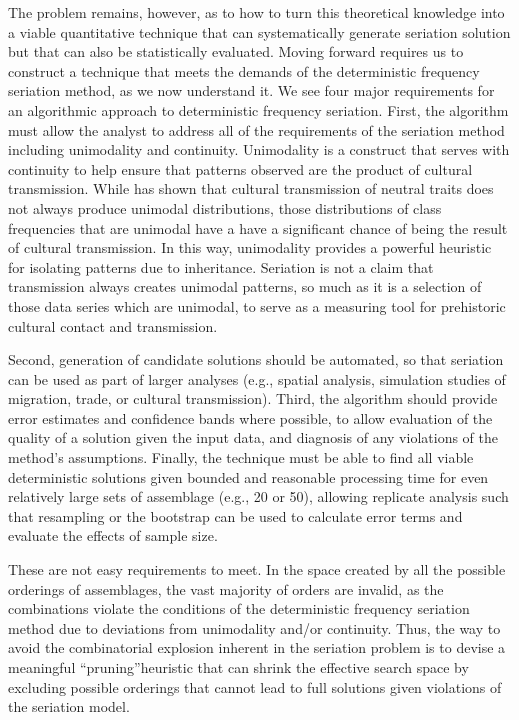 \documentclass[10pt,letterpaper]{article}
\begin{document}
The problem remains, however, as to how to turn this theoretical knowledge into a viable quantitative technique that can systematically generate seriation solution but that can also be statistically evaluated. Moving forward requires us to construct a technique that meets the demands of the deterministic frequency seriation method, as we now understand it. We see four major requirements for an algorithmic approach to deterministic frequency seriation. First, the algorithm must allow the analyst to address all of the requirements of the seriation method including unimodality and continuity.  Unimodality is a construct that serves with continuity to help ensure that patterns observed are the product of cultural transmission. While \cite{Neiman1995} has shown that cultural transmission of neutral traits does not always produce unimodal distributions, those distributions of class frequencies that are unimodal have a have a significant chance of being the result of cultural transmission.  In this way, unimodality provides a powerful heuristic for isolating patterns due to inheritance.  Seriation is not a claim that transmission always creates unimodal patterns, so much as it is a selection of those data series which are unimodal, to serve as a measuring tool for prehistoric cultural contact and transmission. 

Second, generation of candidate solutions should be automated, so that seriation can be used as part of larger analyses (e.g., spatial analysis, simulation studies of migration, trade, or cultural transmission). Third, the algorithm should provide error estimates and confidence bands where possible, to allow evaluation of the quality of a solution given the input data, and diagnosis of any violations of the method’s assumptions. Finally, the technique must be able to find all viable deterministic solutions given bounded and reasonable processing time for even relatively large sets of assemblage (e.g., 20 or 50), allowing replicate analysis such that resampling or the bootstrap can be used to calculate error terms and evaluate the effects of sample size. 

These are not easy requirements to meet. In the space created by all the possible orderings of assemblages, the vast majority of orders are invalid, as the combinations violate the conditions of the deterministic frequency seriation method due to deviations from unimodality and/or continuity. Thus, the way to avoid the combinatorial explosion inherent in the seriation problem is to devise a meaningful ``pruning''heuristic that can shrink the effective search space by excluding possible orderings that cannot lead to full solutions given violations of the seriation model.
\end{document}
